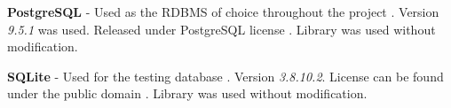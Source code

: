 \textbf{PostgreSQL} - Used as the RDBMS of choice throughout the project \cite{citeulike:1351635}. Version \textit{9.5.1} was used. Released under PostgreSQL license \cite{citeulike:14027320}. Library was used without modification.

\textbf{SQLite} - Used for the testing database \cite{citeulike:14027309}. Version \textit{3.8.10.2}. License can be found under the public domain \cite{citeulike:14027312}. Library was used without modification.

